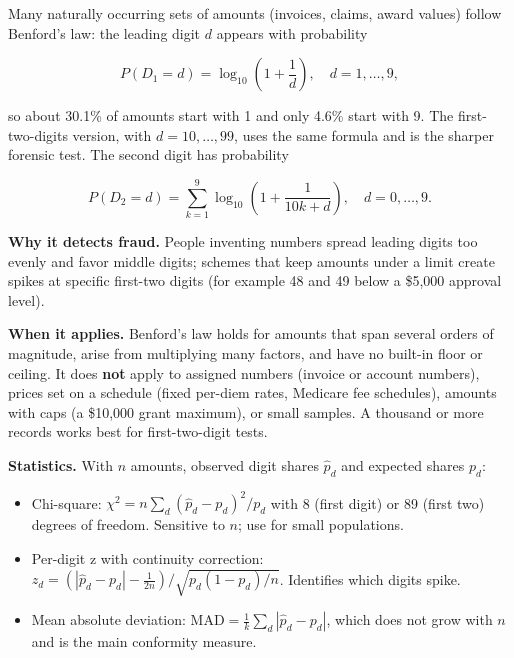 \documentclass[letterpaper,11pt]{article}
\providecommand{\tightlist}{\setlength{\itemsep}{0pt}\setlength{\parskip}{0pt}}
\begin{document}
Many naturally occurring sets of amounts (invoices, claims, award
values) follow Benford's law: the leading digit \(d\) appears with
probability

\[P(D_1 = d) = \log_{10}\left(1 + \frac{1}{d}\right), \quad d = 1, \dots, 9,\]

so about 30.1\% of amounts start with 1 and only 4.6\% start with 9. The
first-two-digits version, with \(d = 10, \dots, 99\), uses the same
formula and is the sharper forensic test. The second digit has
probability

\[P(D_2 = d) = \sum_{k=1}^{9} \log_{10}\left(1 + \frac{1}{10k + d}\right), \quad d = 0, \dots, 9.\]

\textbf{Why it detects fraud.} People inventing numbers spread leading
digits too evenly and favor middle digits; schemes that keep amounts
under a limit create spikes at specific first-two digits (for example 48
and 49 below a \$5,000 approval level).

\textbf{When it applies.} Benford's law holds for amounts that span
several orders of magnitude, arise from multiplying many factors, and
have no built-in floor or ceiling. It does \textbf{not} apply to
assigned numbers (invoice or account numbers), prices set on a schedule
(fixed per-diem rates, Medicare fee schedules), amounts with caps (a
\$10,000 grant maximum), or small samples. A thousand or more records
works best for first-two-digit tests.

\textbf{Statistics.} With \(n\) amounts, observed digit shares
\(\hat p_d\) and expected shares \(p_d\):

\begin{itemize}
\tightlist
\item
  Chi-square: \(\chi^2 = n \sum_d (\hat p_d - p_d)^2 / p_d\) with 8
  (first digit) or 89 (first two) degrees of freedom. Sensitive to
  \(n\); use for small populations.
\item
  Per-digit z with continuity correction:
  \(z_d = \left(|\hat p_d - p_d| - \tfrac{1}{2n}\right) / \sqrt{p_d(1-p_d)/n}\).
  Identifies which digits spike.
\item
  Mean absolute deviation:
  \(\text{MAD} = \frac{1}{k}\sum_d |\hat p_d - p_d|\), which does not
  grow with \(n\) and is the main conformity measure.
\end{itemize}
\end{document}
